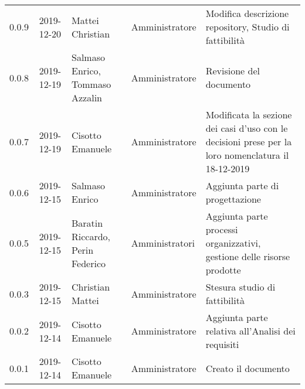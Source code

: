 {\begin{longtable}{c c  C{4cm}  C{3cm} C{4cm}}
0.0.9 & 2019-12-20 & Mattei Christian & Amministratore & Modifica descrizione repository, Studio di fattibilità \\

0.0.8 & 2019-12-19 & Salmaso Enrico, Tommaso Azzalin & Amministratore & Revisione del documento \\

0.0.7 & 2019-12-19 & Cisotto Emanuele & Amministratore & Modificata la sezione dei casi d’uso con le decisioni prese per la loro nomenclatura il 18-12-2019 \\

0.0.6 & 2019-12-15 & Salmaso Enrico & Amministratore & Aggiunta parte di progettazione \\

0.0.5 & 2019-12-15 & Baratin Riccardo, Perin Federico  & Amministratori & Aggiunta parte processi organizzativi, gestione delle risorse prodotte \\

0.0.3 & 2019-12-15 & Christian Mattei & Amministratore & Stesura studio di fattibilità \\

0.0.2 & 2019-12-14 & Cisotto Emanuele & Amministratore & Aggiunta parte relativa all’Analisi dei requisiti \\

0.0.1 & 2019-12-14 & Cisotto Emanuele & Amministratore & Creato il documento \\
		
\end{longtable}
}